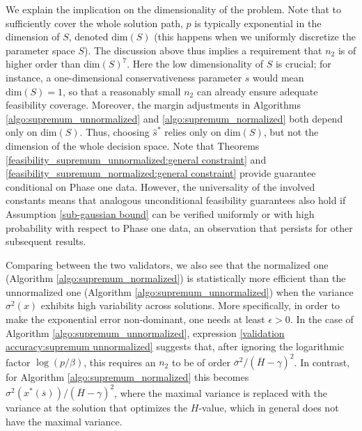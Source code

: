 \documentclass[mnsc,blindrev]{informs4} %
\begin{document}
We explain the implication on the dimensionality of the problem. Note that to sufficiently cover the whole solution path, $p$ is typically exponential in the dimension of $S$, denoted $\text{dim}(S)$ (this happens when we uniformly discretize the parameter space $S$). The discussion above thus implies a requirement that $n_2$ is of higher order than $\text{dim}(S)^7$. Here the low dimensionality of $S$ is crucial; for instance, a one-dimensional conservativeness parameter $s$ would mean $\text{dim}(S)=1$, so that a reasonably small $n_2$ can already ensure adequate feasibility coverage. Moreover, the margin adjustments in Algorithms \ref{algo:supremum_unnormalized} and \ref{algo:supremum_normalized} both depend only on $\text{dim}(S)$. Thus, choosing $\hat s^*$ relies only on $\text{dim}(S)$, but not the dimension of the whole decision space.
Note that Theorems \ref{feasibility_supremum_unnormalized:general constraint} and \ref{feasibility_supremum_normalized:general constraint} provide guarantee conditional on Phase one data. However, the universality of the involved constants means that analogous unconditional feasibility guarantees also hold if Assumption \ref{sub-gaussian bound} can be verified uniformly or with high probability with respect to Phase one data, an observation that persists for other subsequent results.

Comparing between the two validators, we also see that the normalized one (Algorithm \ref{algo:supremum_normalized}) is statistically more efficient than the unnormalized one (Algorithm \ref{algo:supremum_unnormalized}) when the variance $\sigma^2(x)$ exhibits high variability across solutions. More specifically, in order to make the exponential error non-dominant, one needs at least $\epsilon>0$. In the case of Algorithm \ref{algo:supremum_unnormalized}, expression \eqref{validation accuracy:supremum unnormalized} suggests that, after ignoring the logarithmic factor $\log(p/\beta)$, this requires an $n_2$ to be of order $\overline{\sigma}^2/(\overline{H}-\gamma)^2$. In contrast, for Algorithm \ref{algo:supremum_normalized} this becomes $\sigma^2(x^*(\overline{s}))/(\overline{H}-\gamma)^2$, where the maximal variance is replaced with the variance at the solution that optimizes the $H$-value, which in general does not have the maximal variance.
\end{document}
